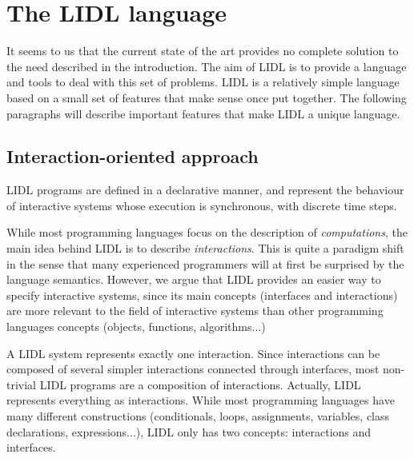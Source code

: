\documentclass[10pt]{sigplanconf}
\begin{document}
%
%
%
%

\section{The LIDL language}

It seems to us that the current state of the art provides no complete solution to the need described in the introduction. The aim of LIDL is to provide a language and tools to deal with this set of problems. LIDL is a relatively simple language based on a small set of features that make sense once put together. The following paragraphs will describe important features that make LIDL a unique language.

\subsection{Interaction-oriented approach}

LIDL programs are defined in a declarative manner, and represent the behaviour of interactive systems whose execution is synchronous, with discrete time steps.

While most programming languages focus on the description of \emph{computations}, the main idea behind LIDL is to describe \emph{interactions}. This is quite a paradigm shift in the sense that many experienced programmers will at first be surprised by the language semantics. However, we argue that LIDL provides an easier way to specify interactive systems, since its main concepts (interfaces and interactions) are more relevant to the field of interactive systems than other programming languages concepts (objects, functions, algorithms...)

A LIDL system represents exactly one interaction. Since interactions can be composed of several simpler interactions connected through interfaces, most non-trivial LIDL programs are a composition of interactions. Actually, LIDL represents everything as interactions. While most programming languages have many different constructions (conditionals, loops, assignments, variables, class declarations, expressions...), LIDL only has two concepts: interactions and interfaces. 
\end{document}
